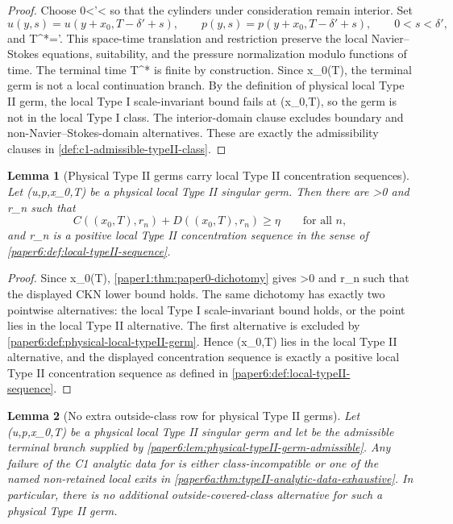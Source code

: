 \documentclass[11pt]{amsart}
\def\({}%
\def\){}%
\def\tilde#1{#1}%
\theoremstyle{plain}
\newtheorem{lemma}[lemma]{Lemma}
\theoremstyle{definition}
\theoremstyle{remark}
\begin{document}
\begin{proof}
Choose \(0<\delta'<\delta\) so that the cylinders under consideration remain
interior.  Set
\[
  \tilde u(y,s)=u(y+x_0,T-\delta'+s),\qquad
  \tilde p(y,s)=p(y+x_0,T-\delta'+s),
  \qquad 0<s<\delta',
\]
and \(T^*=\delta'\).  This space-time translation and restriction preserve the
local Navier--Stokes equations, suitability, and the pressure normalization
modulo functions of time.  The terminal time \(T^*\) is finite by construction.
Since \(x_0\in\Sigma(T)\), the terminal germ is not a local continuation
branch.  By the definition of physical local Type II germ, the local Type I
scale-invariant bound fails at \((x_0,T)\), so the germ is not in the local
Type I class.  The interior-domain clause excludes boundary and
non-Navier--Stokes-domain alternatives.  These are exactly the admissibility
clauses in \cref{def:c1-admissible-typeII-class}.
\end{proof}

\begin{lemma}[Physical Type II germs carry local Type II concentration sequences]
\label{paper6:lem:physical-typeII-germ-concentration-sequence}
Let \((u,p,x_0,T)\) be a physical local Type II singular germ.  Then there are
\(\eta>0\) and \(r_n\) such that
\[
  C((x_0,T),r_n)+D((x_0,T),r_n)\ge\eta
  \qquad\text{for all }n,
\]
and \(r_n\) is a positive local Type II concentration sequence in the sense of
\cref{paper6:def:local-typeII-sequence}.
\end{lemma}

\begin{proof}
Since \(x_0\in\Sigma(T)\), \cref{paper1:thm:paper0-dichotomy} gives
\(\eta>0\) and \(r_n\) such that the displayed CKN lower bound
holds.  The same dichotomy has exactly two pointwise alternatives: the local
Type I scale-invariant bound holds, or the point lies in the local Type II
alternative.  The first alternative is excluded by
\cref{paper6:def:physical-local-typeII-germ}.  Hence \((x_0,T)\) lies in the
local Type II alternative, and the displayed concentration sequence is exactly
a positive local Type II concentration sequence as defined in
\cref{paper6:def:local-typeII-sequence}.
\end{proof}

\begin{lemma}[No extra outside-class row for physical Type II germs]
\label{paper6:lem:no-extra-outside-class-row}
Let \((u,p,x_0,T)\) be a physical local Type II singular germ and let
\(\omega\) be the admissible terminal branch supplied by
\cref{paper6:lem:physical-typeII-germ-admissible}.  Any failure of the C1
analytic data for \(\omega\) is either class-incompatible or one of the named
non-retained local exits in
\cref{paper6a:thm:typeII-analytic-data-exhaustive}.  In particular, there is no
additional outside-covered-class alternative for such a physical Type II germ.
\end{lemma}
\end{document}
